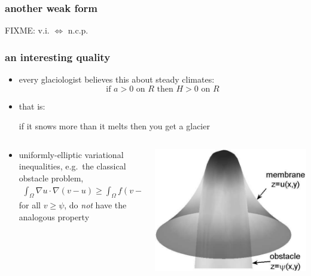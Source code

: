 \documentclass[hide notes,intlimits]{beamer}
\begin{document}
\begin{frame}
  \frametitle{another weak form} 

FIXME: v.i. $\iff$ n.c.p.
\end{frame}


\begin{frame}
  \frametitle{an interesting quality} 

\begin{itemize}
\item every glaciologist believes this about steady climates:
	$$\text{if } a > 0 \text{ on } R \text{ then } H > 0 \text{ on } R$$
\item that is:
\begin{center}
 if it snows more than it melts then you get a glacier
\end{center}
\end{itemize}

\begin{columns}
\begin{column}{0.6\textwidth}
\begin{itemize}
\small
\item uniformly-elliptic variational inequalities, e.g.~the classical obstacle problem,
\begin{align*}
\int_{\Omega}  \nabla u \cdot \nabla (v - u)  \ge  \int_{\Omega} f (v - u),
\end{align*}
for all $v\ge \psi$, do \emph{not} have the analogous property
\end{itemize}
\end{column}
\begin{column}{0.4\textwidth}
\includegraphics[width=\textwidth]{classicalobs}
\end{column}
\end{columns}
\end{frame}
\end{document}
